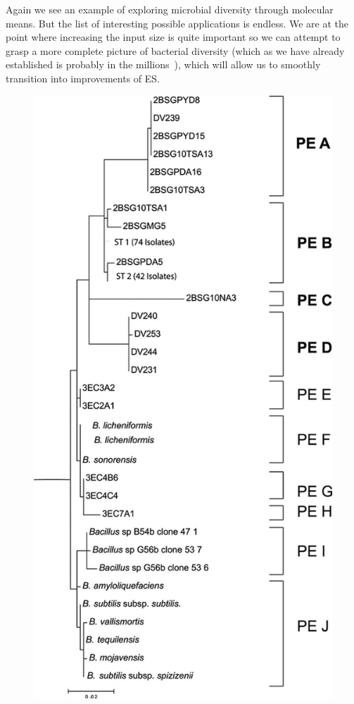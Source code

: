 Again we see an example of exploring microbial diversity through molecular means.
But the list of interesting possible applications is endless.
We are at the point where increasing the input size is quite important so we can attempt to grasp a more complete picture of bacterial diversity (which as we have already established is probably in the millions~\cite{cohan2008origins}), which will allow us to smoothly transition into improvements of ES.

\begin{figure}[h!]
\centering
\includegraphics[scale=0.45]{images/DeathValleyES-CH2}

\end{figure}
